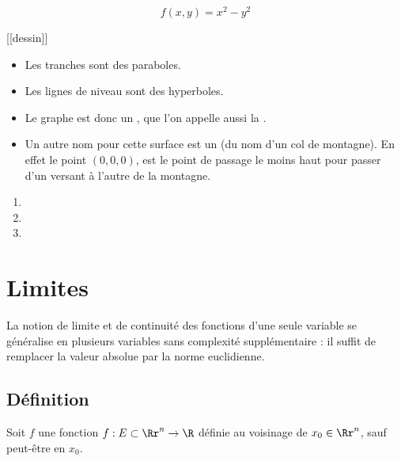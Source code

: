 \documentclass[12pt, class=report,crop=false]{standalone}
\begin{document}
\begin{exemple}
$$f(x,y) = x^2-y^2$$

[[dessin]]

\begin{itemize}
  \item Les tranches sont des paraboles.
  \item Les lignes de niveau sont des hyperboles.
  \item Le graphe est donc un , que l'on appelle aussi la .
  \item Un autre nom pour cette surface est un  (du nom d'un col de montagne). 
  En effet le point $(0,0,0)$, est le point de passage le moins haut pour passer d'un versant à l'autre de la montagne. 
\end{itemize}

\end{exemple}



 
\begin{miniexercices}
\sauteligne
\begin{enumerate}
  \item 
  
  \item 
  
  \item 
  
\end{enumerate}
\end{miniexercices}


\section{Limites}


La notion de limite et de continuité des fonctions d'une seule variable se généralise 
en plusieurs variables sans complexité supplémentaire : il suffit de remplacer la valeur absolue par la norme euclidienne.


\subsection{Définition}



Soit $f$ une fonction $f: E \subset \Rr^n \to \R$ définie au voisinage de $x_0 \in \Rr^n$, sauf peut-être en $x_0$.
\end{document}
